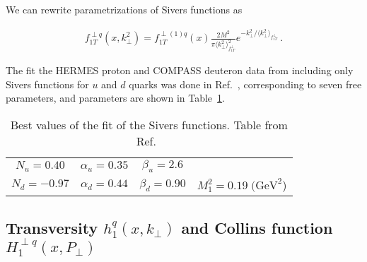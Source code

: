 \documentclass[a4paper,11pt]{article}
\newcommand{\ba}{\begin{eqnarray}}
\newcommand{\ea}{\end{eqnarray}}
\newcommand{\la}{\langle}
\newcommand{\ra}{\rangle}
\def\kperp{k_\perp}
\def\avkperp{\la \kperp^2 \ra}
\begin{document}
We can rewrite parametrizations of Sivers functions as

\ba
f_{1T}^{\perp q}(x,\kperp^2) =  f_{1T}^{\perp (1) q}(x)   \frac{2 M^2}{\pi \avkperp_{f_{1T}^\perp}^2} e^{-\kperp^2/{\avkperp_{f_{1T}^\perp}}}
\label{sivers_new} \ .
\ea

The fit the HERMES proton and COMPASS deuteron data from
including only Sivers functions for $u$ and $d$ quarks was done in Ref.~\cite{Anselmino:2011gs},
corresponding to seven free parameters, and parameters are shown in Table~\ref{tab:a}.


\begin{table}
\centering
\begin{tabular}{cccc}
\hline
$N_u=0.40$ & $\alpha_u=0.35$ & $\beta_u=2.6$ & \\
$N_d=-0.97$ & $\alpha_d=0.44$ & $\beta_d=0.90$ & $M_1^2=0.19\;\textrm{(GeV}^2$)\\
\hline
\end{tabular}
	\caption{Best values of the fit of the Sivers functions.
	Table from Ref.~\cite{Anselmino:2011gs}}
\label{tab:a}
\end{table}



\subsection{\boldmath Transversity $h_{1}^{q}(x,k_\perp)$ and
Collins function $H_{1}^{\perp q}(x,P_\perp)$}
\label{App:basis-h1-H1perp}
\end{document}
